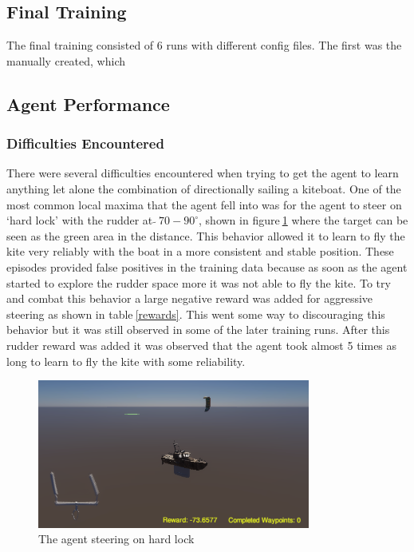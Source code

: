 \subsection{Final Training}

The final training consisted of 6 runs with different config files. The first was the manually created, which 


\subsection{Agent Performance}

\subsubsection*{Difficulties Encountered}
There were several difficulties encountered when trying to get the agent to learn anything let alone the combination of directionally sailing a kiteboat. One of the most common local maxima that the agent fell into was for the agent to steer on `hard lock' with the rudder at \textit{$\tilde{} ~70-90^{\circ}$}, shown in figure$~$\ref{hard_lock} where the target can be seen as the green area in the distance. This behavior allowed it to learn to fly the kite very reliably with the boat in a more consistent and stable position. These episodes provided false positives in the training data because as soon as the agent started to explore the rudder space more it was not able to fly the kite. To try and combat this behavior a large negative reward was added for aggressive steering as shown in table$~$\ref{rewards}. This went some way to discouraging this behavior but it was still observed in some of the later training runs. After this rudder reward was added it was observed that the agent took almost 5 times as long to learn to fly the kite with some reliability. 

\begin{figure}[!htb]
    \centering
    \includegraphics[width=0.8\textwidth]{Images/hard_lock.png}
    \caption{The agent steering on hard lock}\label{hard_lock}
\end{figure}


